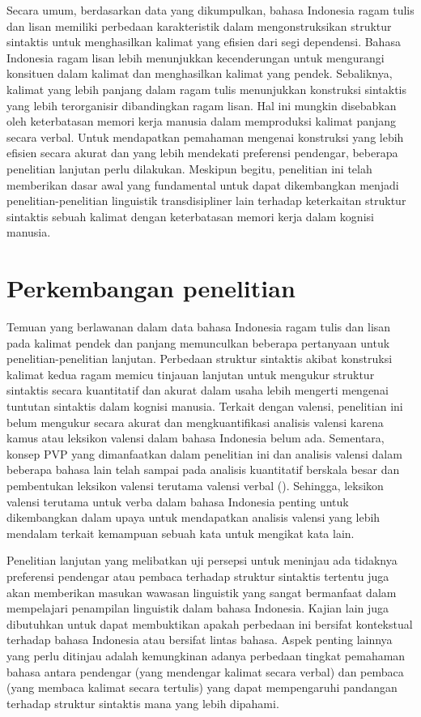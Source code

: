 Secara umum, berdasarkan data yang dikumpulkan, bahasa Indonesia ragam tulis dan lisan memiliki perbedaan karakteristik dalam mengonstruksikan struktur sintaktis untuk menghasilkan kalimat yang efisien dari segi dependensi. Bahasa Indonesia ragam lisan lebih menunjukkan kecenderungan untuk mengurangi konsituen dalam kalimat dan menghasilkan kalimat yang pendek. Sebaliknya, kalimat yang lebih panjang dalam ragam tulis menunjukkan konstruksi sintaktis yang lebih terorganisir dibandingkan ragam lisan. Hal ini mungkin disebabkan oleh keterbatasan memori kerja manusia dalam memproduksi kalimat panjang secara verbal. Untuk mendapatkan pemahaman mengenai konstruksi yang lebih efisien secara akurat dan yang lebih mendekati preferensi pendengar, beberapa penelitian lanjutan perlu dilakukan. Meskipun begitu, penelitian ini telah memberikan dasar awal yang fundamental untuk dapat dikembangkan menjadi penelitian-penelitian linguistik transdisipliner lain terhadap keterkaitan struktur sintaktis sebuah kalimat dengan keterbatasan memori kerja dalam kognisi manusia.

\section{Perkembangan penelitian}

Temuan yang berlawanan dalam data bahasa Indonesia ragam tulis dan lisan pada kalimat pendek dan panjang memunculkan beberapa pertanyaan untuk penelitian-penelitian lanjutan. Perbedaan struktur sintaktis akibat konstruksi kalimat kedua ragam memicu tinjauan lanjutan untuk mengukur struktur sintaktis secara kuantitatif dan akurat dalam usaha lebih mengerti mengenai tuntutan sintaktis dalam kognisi manusia. Terkait dengan valensi, penelitian ini belum mengukur secara akurat dan mengkuantifikasi analisis valensi karena kamus atau leksikon valensi dalam bahasa Indonesia belum ada. Sementara, konsep PVP \citep{liu2006syntactic} yang dimanfaatkan dalam penelitian ini dan analisis valensi dalam beberapa bahasa lain telah sampai pada analisis kuantitatif berskala besar dan pembentukan leksikon valensi terutama valensi verbal (\citealp{zabokrtsky2005valency, bielicky2008building, passarotti2016latin, semecky2006constructing}). Sehingga, leksikon valensi terutama untuk verba dalam bahasa Indonesia penting untuk dikembangkan dalam upaya untuk mendapatkan analisis valensi yang lebih mendalam terkait kemampuan sebuah kata untuk mengikat kata lain. 

Penelitian lanjutan yang melibatkan uji persepsi untuk meninjau ada tidaknya preferensi pendengar atau pembaca terhadap struktur sintaktis tertentu juga akan memberikan masukan wawasan linguistik yang sangat bermanfaat dalam mempelajari penampilan linguistik dalam bahasa Indonesia. Kajian lain juga dibutuhkan untuk dapat membuktikan apakah perbedaan ini bersifat kontekstual terhadap bahasa Indonesia atau bersifat lintas bahasa. Aspek penting lainnya yang perlu ditinjau adalah kemungkinan adanya perbedaan tingkat pemahaman bahasa antara pendengar (yang mendengar kalimat secara verbal) dan pembaca (yang membaca kalimat secara tertulis) yang dapat mempengaruhi pandangan terhadap struktur sintaktis mana yang lebih dipahami. 